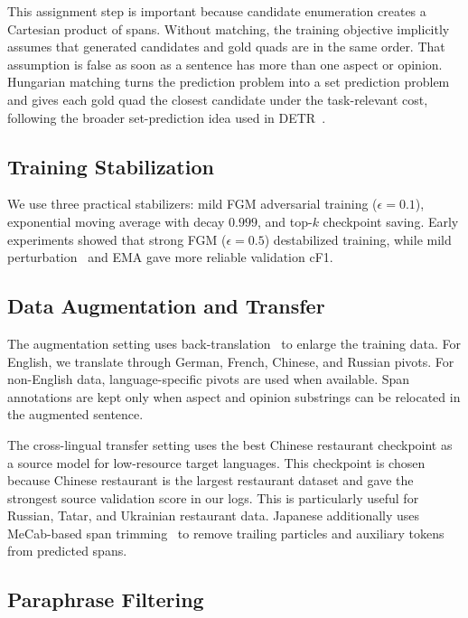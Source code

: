 \documentclass[runningheads]{llncs}
\begin{document}
This assignment step is important because candidate enumeration creates
a Cartesian product of spans. Without matching, the training objective
implicitly assumes that generated candidates and gold quads are in the
same order. That assumption is false as soon as a sentence has more
than one aspect or opinion. Hungarian matching turns the prediction
problem into a set prediction problem and gives each gold quad the
closest candidate under the task-relevant cost, following the broader
set-prediction idea used in DETR~\cite{carion2020detr}.

\subsection{Training Stabilization}

We use three practical stabilizers: mild FGM adversarial training
($\epsilon=0.1$), exponential moving average with decay $0.999$, and
top-$k$ checkpoint saving. Early experiments showed that strong FGM
($\epsilon=0.5$) destabilized training, while mild perturbation~\cite{miyato2017adv} and
EMA gave more reliable validation cF1.

\subsection{Data Augmentation and Transfer}

The augmentation setting uses back-translation~\cite{sennrich2016bt} to enlarge the training data. For English,
we translate through German, French, Chinese, and Russian pivots. For
non-English data, language-specific pivots are used when available.
Span annotations are kept only when aspect and opinion substrings can
be relocated in the augmented sentence.

The cross-lingual transfer setting uses the best Chinese restaurant
checkpoint as a source model for low-resource target languages. This
checkpoint is chosen because Chinese restaurant is the largest
restaurant dataset and gave the strongest source validation score in
our logs. This is particularly useful for Russian, Tatar, and Ukrainian restaurant data. Japanese
additionally uses MeCab-based span trimming~\cite{kudo2004mecab} to remove trailing particles
and auxiliary tokens from predicted spans.

\subsection{Paraphrase Filtering}
\end{document}
